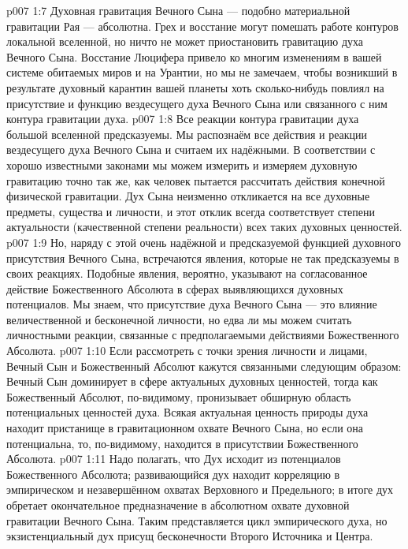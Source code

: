 \vs p007 1:7 \pc Духовная гравитация Вечного Сына --- подобно материальной гравитации Рая --- абсолютна. Грех и восстание могут помешать работе контуров локальной вселенной, но ничто не может приостановить гравитацию духа Вечного Сына. Восстание Люцифера привело ко многим изменениям в вашей системе обитаемых миров и на Урантии, но мы не замечаем, чтобы возникший в результате духовный карантин вашей планеты хоть сколько\hyp{}нибудь повлиял на присутствие и функцию вездесущего духа Вечного Сына или связанного с ним контура гравитации духа.
\vs p007 1:8 \pc Все реакции контура гравитации духа большой вселенной предсказуемы. Мы распознаём все действия и реакции вездесущего духа Вечного Сына и считаем их надёжными. В соответствии с хорошо известными законами мы можем измерить и измеряем духовную гравитацию точно так же, как человек пытается рассчитать действия конечной физической гравитации. Дух Сына неизменно откликается на все духовные предметы, существа и личности, и этот отклик всегда соответствует степени актуальности (качественной степени реальности) всех таких духовных ценностей.
\vs p007 1:9 Но, наряду с этой очень надёжной и предсказуемой функцией духовного присутствия Вечного Сына, встречаются явления, которые не так предсказуемы в своих реакциях. Подобные явления, вероятно, указывают на согласованное действие Божественного Абсолюта в сферах выявляющихся духовных потенциалов. Мы знаем, что присутствие духа Вечного Сына --- это влияние величественной и бесконечной личности, но едва ли мы можем считать личностными реакции, связанные с предполагаемыми действиями Божественного Абсолюта.
\vs p007 1:10 \pc Если рассмотреть с точки зрения личности и лицами, Вечный Сын и Божественный Абсолют кажутся связанными следующим образом: Вечный Сын доминирует в сфере актуальных духовных ценностей, тогда как Божественный Абсолют, по\hyp{}видимому, пронизывает обширную область потенциальных ценностей духа. Всякая актуальная ценность природы духа находит пристанище в гравитационном охвате Вечного Сына, но если она потенциальна, то, по\hyp{}видимому, находится в присутствии Божественного Абсолюта.
\vs p007 1:11 Надо полагать, что Дух исходит из потенциалов Божественного Абсолюта; развивающийся дух находит корреляцию в эмпирическом и незавершённом охватах Верховного и Предельного; в итоге дух обретает окончательное предназначение в абсолютном охвате духовной гравитации Вечного Сына. Таким представляется цикл эмпирического духа, но экзистенциальный дух присущ бесконечности Второго Источника и Центра.
